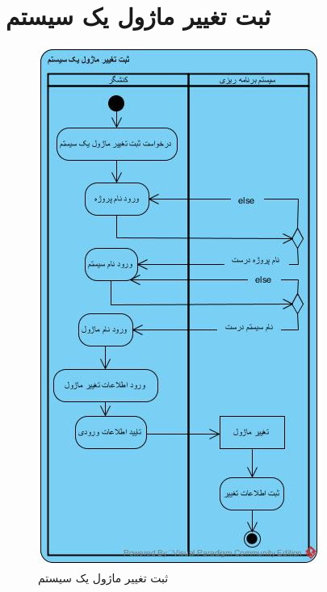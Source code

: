 \section{ثبت تغییر ماژول یک سیستم}
\begin{figure}[H]
	\centering
	\includegraphics[scale=0.7]{img/activity/AddModuleModification}
	\caption{ثبت تغییر ماژول یک سیستم}
\end{figure}


